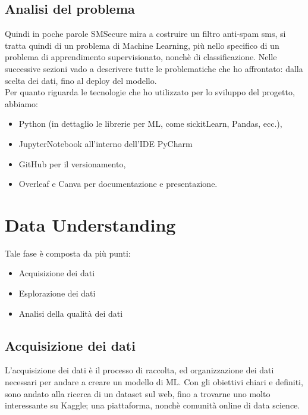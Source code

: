 \documentclass[]{article}
\begin{document}
        \subsection{Analisi del problema}
            Quindi in poche parole SMSecure mira a costruire un filtro anti-spam sms, si tratta quindi di un problema di Machine Learning, più nello specifico di un problema di apprendimento supervisionato, nonchè di classificazione. Nelle successive sezioni vado a descrivere tutte le problematiche che ho affrontato: dalla scelta dei dati, fino al deploy del modello.\\
            Per quanto riguarda le tecnologie che ho utilizzato per lo sviluppo del progetto, abbiamo:
            \begin{itemize}
                \item Python (in dettaglio le librerie per ML, come sickitLearn, Pandas,  ecc.),
                \item JupyterNotebook all'interno dell'IDE PyCharm
                \item GitHub per il versionamento,
                \item Overleaf e Canva per documentazione e presentazione.
            \end{itemize}
\newpage
\section{Data Understanding}
    Tale fase è composta da più punti:
    \begin{itemize}
        \item Acquisizione dei dati
        \item Esplorazione dei dati
        \item Analisi della qualità dei dati
    \end{itemize}
    \subsection{Acquisizione dei dati}
        L'acquisizione dei dati è il processo di raccolta, ed organizzazione dei dati necessari per andare a creare un modello di ML. Con gli obiettivi chiari e definiti, sono andato alla ricerca di un dataset sul web, fino a trovarne uno molto interessante su Kaggle; una piattaforma, nonchè comunità online di data science. \\
\end{document}
